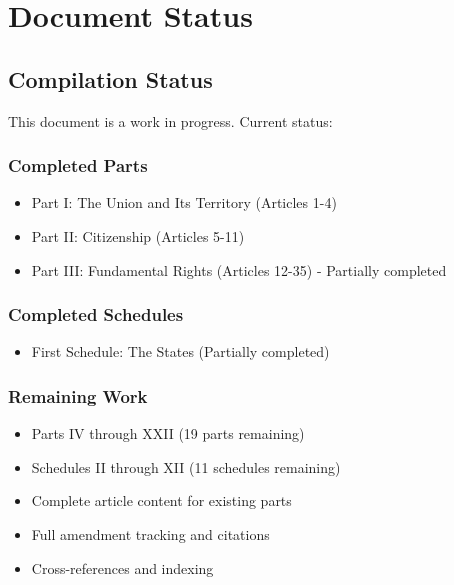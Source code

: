 \documentclass[a4paper,12pt,showamendments]{soi}
\begin{document}
\ifcompilepart
    \clearpage
    \section*{Document Status}
    
    \subsection*{Compilation Status}
    This document is a work in progress. Current status:
    
    \subsubsection*{Completed Parts}
    \begin{itemize}
    \item Part I: The Union and Its Territory (Articles 1-4)
    \item Part II: Citizenship (Articles 5-11)  
    \item Part III: Fundamental Rights (Articles 12-35) - Partially completed
    \end{itemize}
    
    \subsubsection*{Completed Schedules}
    \begin{itemize}
    \item First Schedule: The States (Partially completed)
    \end{itemize}
    
    \subsubsection*{Remaining Work}
    \begin{itemize}
    \item Parts IV through XXII (19 parts remaining)
    \item Schedules II through XII (11 schedules remaining) 
    \item Complete article content for existing parts
    \item Full amendment tracking and citations
    \item Cross-references and indexing
    \end{itemize}
    
\end{document}
